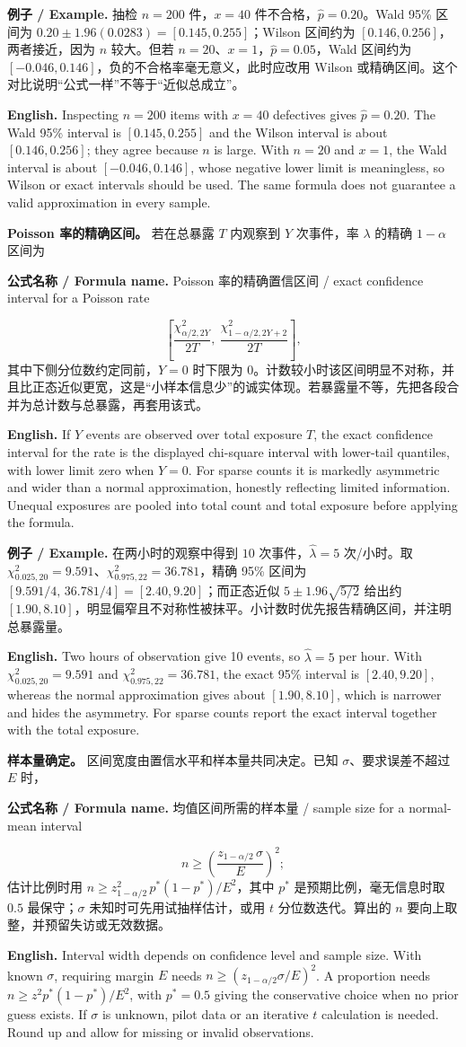 \documentclass[UTF8,11pt,a4paper]{ctexart}
\newcommand{\EN}[1]{\par\noindent\textbf{English.} #1\par}
\newcommand{\FORMULA}[2]{\par\noindent\textbf{公式名称 / Formula name.} #1 / #2\par}
\newcommand{\EX}[2]{\par\noindent\textbf{例子 / Example.} #1\par\EN{#2}}
\begin{document}
\EX{抽检 $n=200$ 件，$x=40$ 件不合格，$\hat p=0.20$。Wald 95\% 区间为 $0.20\pm1.96(0.0283)=[0.145,0.255]$；Wilson 区间约为 $[0.146,0.256]$，两者接近，因为 $n$ 较大。但若 $n=20$、$x=1$，$\hat p=0.05$，Wald 区间约为 $[-0.046,0.146]$，负的不合格率毫无意义，此时应改用 Wilson 或精确区间。这个对比说明“公式一样”不等于“近似总成立”。}{Inspecting $n=200$ items with $x=40$ defectives gives $\hat p=0.20$. The Wald 95\% interval is $[0.145,0.255]$ and the Wilson interval is about $[0.146,0.256]$; they agree because $n$ is large. With $n=20$ and $x=1$, the Wald interval is about $[-0.046,0.146]$, whose negative lower limit is meaningless, so Wilson or exact intervals should be used. The same formula does not guarantee a valid approximation in every sample.}

\noindent\textbf{Poisson 率的精确区间。} 若在总暴露 $T$ 内观察到 $Y$ 次事件，率 $\lambda$ 的精确 $1-\alpha$ 区间为
\FORMULA{Poisson 率的精确置信区间}{exact confidence interval for a Poisson rate}
\[
\left[\frac{\chi^2_{\alpha/2,2Y}}{2T},\ \frac{\chi^2_{1-\alpha/2,2Y+2}}{2T}\right],
\]
其中下侧分位数约定同前，$Y=0$ 时下限为 $0$。计数较小时该区间明显不对称，并且比正态近似更宽，这是“小样本信息少”的诚实体现。若暴露量不等，先把各段合并为总计数与总暴露，再套用该式。
\EN{If $Y$ events are observed over total exposure $T$, the exact confidence interval for the rate is the displayed chi-square interval with lower-tail quantiles, with lower limit zero when $Y=0$. For sparse counts it is markedly asymmetric and wider than a normal approximation, honestly reflecting limited information. Unequal exposures are pooled into total count and total exposure before applying the formula.}

\EX{在两小时的观察中得到 $10$ 次事件，$\hat\lambda=5$ 次/小时。取 $\chi^2_{0.025,20}=9.591$、$\chi^2_{0.975,22}=36.781$，精确 95\% 区间为 $[9.591/4,\,36.781/4]=[2.40,9.20]$；而正态近似 $5\pm1.96\sqrt{5/2}$ 给出约 $[1.90,8.10]$，明显偏窄且不对称性被抹平。小计数时优先报告精确区间，并注明总暴露量。}{Two hours of observation give 10 events, so $\hat\lambda=5$ per hour. With $\chi^2_{0.025,20}=9.591$ and $\chi^2_{0.975,22}=36.781$, the exact 95\% interval is $[2.40,9.20]$, whereas the normal approximation gives about $[1.90,8.10]$, which is narrower and hides the asymmetry. For sparse counts report the exact interval together with the total exposure.}

\noindent\textbf{样本量确定。} 区间宽度由置信水平和样本量共同决定。已知 $\sigma$、要求误差不超过 $E$ 时，
\FORMULA{均值区间所需的样本量}{sample size for a normal-mean interval}
\[
n\ge\left(\frac{z_{1-\alpha/2}\,\sigma}{E}\right)^2;
\]
估计比例时用 $n\ge z_{1-\alpha/2}^2\,p^*(1-p^*)/E^2$，其中 $p^*$ 是预期比例，毫无信息时取 $0.5$ 最保守；$\sigma$ 未知时可先用试抽样估计，或用 $t$ 分位数迭代。算出的 $n$ 要向上取整，并预留失访或无效数据。
\EN{Interval width depends on confidence level and sample size. With known $\sigma$, requiring margin $E$ needs $n\ge(z_{1-\alpha/2}\sigma/E)^2$. A proportion needs $n\ge z^2p^*(1-p^*)/E^2$, with $p^*=0.5$ giving the conservative choice when no prior guess exists. If $\sigma$ is unknown, pilot data or an iterative $t$ calculation is needed. Round up and allow for missing or invalid observations.}
\end{document}
